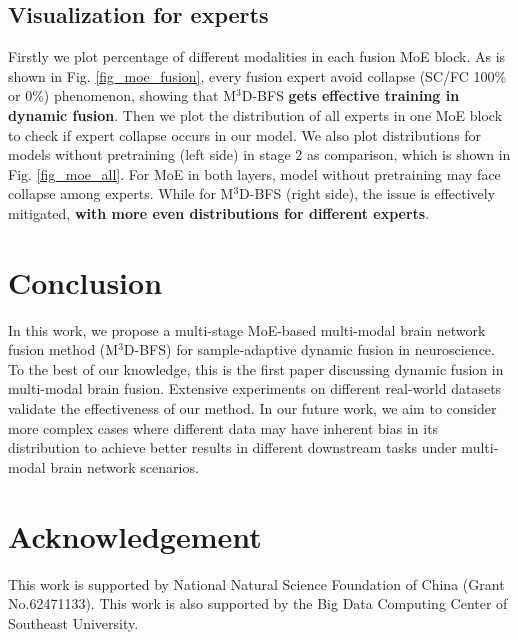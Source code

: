 \documentclass[10pt,twocolumn,letterpaper]{article}
\newcommand{\model}{M$^3$D-BFS }
\begin{document}
\subsection{Visualization for experts}
Firstly we plot percentage of different modalities in each fusion MoE block. As is shown in Fig. \ref{fig_moe_fusion}, every fusion expert avoid collapse (SC/FC 100\% or 0\%) phenomenon, showing that \model \textbf{gets effective training in dynamic fusion}. Then we plot the distribution of all experts in one MoE block to check if expert collapse occurs in our model. We also plot distributions for models without pretraining (left side) in stage 2 as comparison, which is shown in Fig. \ref{fig_moe_all}. For MoE in both layers, model without pretraining may face collapse among experts. While for M$^3$D-BFS (right side), the issue is effectively mitigated, \textbf{with more even distributions for different experts}. 


\section{Conclusion}
 In this work, we propose a multi-stage MoE-based multi-modal brain network fusion method (M$^3$D-BFS) for sample-adaptive dynamic fusion in neuroscience. To the best of our knowledge, this is the first paper discussing dynamic fusion in multi-modal brain fusion. Extensive experiments on different real-world datasets validate the effectiveness of our method. In our future work, we aim to consider more complex cases where different data may have inherent bias in its distribution to achieve better results in different downstream tasks under multi-modal brain network scenarios.



\section*{Acknowledgement}
This work is supported by National Natural Science Foundation of China (Grant No.62471133). 
This work is also supported by the Big Data Computing Center of Southeast University.

{
    \small
    
    
}

% 
\end{document}

